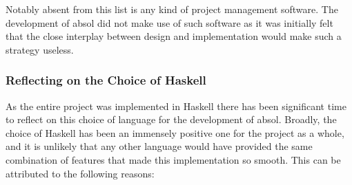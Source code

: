 Notably absent from this list is any kind of project management software.
The development of \gls{absol} did not make use of such software as it was initially felt that the close interplay between design and implementation would make such a strategy useless.

\subsubsection{Reflecting on the Choice of Haskell} %
\label{ssub:reflecting_on_the_choice_of_haskell}
As the entire project was implemented in Haskell there has been significant time to reflect on this choice of language for the development of \gls{absol}.
Broadly, the choice of Haskell has been an immensely positive one for the project as a whole, and it is unlikely that any other language would have provided the same combination of features that made this implementation so smooth.
This can be attributed to the following reasons:

